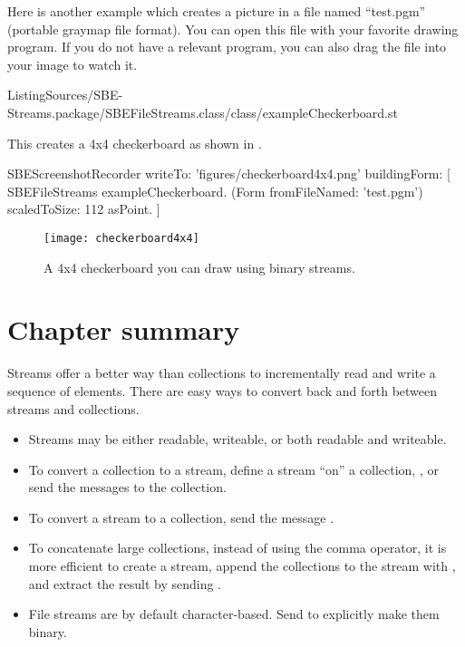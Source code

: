 \documentclass[a4paper,10pt,twoside]{book}
\begin{document}
Here is another example which creates a picture in a file named ``test.pgm'' (portable graymap file format).
You can open this file with your favorite drawing program.
If you do not have a relevant program, you can also drag the file into your \sq image to watch it.

%
{ListingSources/SBE-Streams.package/SBEFileStreams.class/class/exampleCheckerboard.st}

This creates a 4x4 checkerboard as shown in .

\begin{ExecuteSmalltalkScript}
SBEScreenshotRecorder writeTo: 'figures/checkerboard4x4.png' buildingForm: [
	SBEFileStreams exampleCheckerboard.
	(Form fromFileNamed: 'test.pgm') scaledToSize: 112 asPoint.
]
\end{ExecuteSmalltalkScript}
\begin{figure}[!ht]
\centerline{\texttt{[image: checkerboard4x4]}}
\caption{A 4x4 checkerboard you can draw using binary streams.}
\label{fig:checkerboard4x4}
\vspace{.2in}
\end{figure}

\section{Chapter summary}

Streams offer a better way than collections to incrementally read and write a sequence of elements.
There are easy ways to convert back and forth between streams and collections.

\begin{itemize}
	\item Streams may be either readable, writeable, or both readable and writeable.
	\item To convert a collection to a stream, define a stream ``on'' a collection, \eg {}, or send the messages  \etc to the collection.
	\item To convert a stream to a collection, send the message .
	\item To concatenate large collections, instead of using the comma operator, it is more efficient to create a stream, append the collections to the stream with , and extract the result by sending .
  \item File streams are by default character-based.
  Send  to explicitly make them binary.
\end{itemize}

\ifx\wholebook\relax\else
\end{document}
